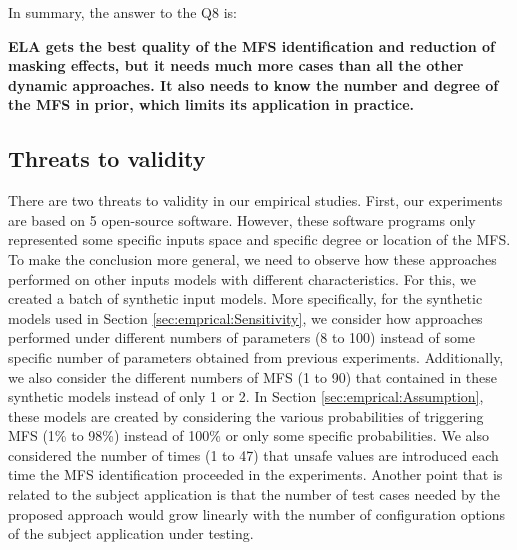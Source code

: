 \documentclass[journal,12pt,onecolumn,draftclsnofoot,]{IEEEtran}
\begin{document}


In summary, the answer to the Q8 is:

\textbf{ ELA gets the best quality of the MFS identification and reduction of masking effects, but it needs much more cases than all the other dynamic approaches.  It also needs to know the number and degree of the MFS in prior, which limits its application in practice.}





\subsection{Threats to validity}

There are two threats to validity in our empirical studies. First, our experiments are based on 5 open-source software.  However, these software programs only represented some specific inputs space and specific degree or location of the MFS. To make the conclusion more general, we need to observe how these approaches performed on other inputs models with different characteristics. For this, we created a batch of synthetic input models.  More specifically, for the synthetic models used in Section \ref{sec:emprical:Sensitivity}, we  consider how approaches performed under different numbers of parameters (8 to 100) instead of some specific number of parameters obtained from previous experiments. Additionally, we also consider the different numbers of MFS (1 to 90) that contained in these synthetic models instead of only 1 or 2. In Section \ref{sec:emprical:Assumption}, these models are created by considering the various probabilities of triggering MFS (1\% to 98\%) instead of 100\% or only some specific probabilities. We also considered the number of times (1 to 47) that unsafe values are introduced each time the MFS identification proceeded in the experiments. {\color{red}Another point that is related to the subject application is that the number of test cases needed by the proposed approach would grow linearly with the number of configuration options of the subject application under testing.}
\end{document}
